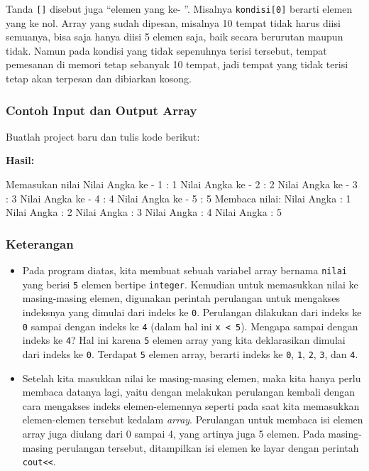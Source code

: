 Tanda \texttt{{[}{]}} disebut juga ``elemen yang ke- ''. Misalnya
\texttt{kondisi{[}0{]}} berarti elemen yang ke nol. Array yang sudah
dipesan, misalnya 10 tempat tidak harus diisi semuanya, bisa saja hanya
diisi 5 elemen saja, baik secara berurutan maupun tidak. Namun pada
kondisi yang tidak sepenuhnya terisi tersebut, tempat pemesanan di
memori tetap sebanyak 10 tempat, jadi tempat yang tidak terisi tetap
akan terpesan dan dibiarkan kosong.

\subsubsection*{Contoh  Input dan Output Array}

Buatlah project baru dan tulis kode berikut:



\textbf{Hasil:}
\begin{lcverbatim}
Memasukan nilai
Nilai Angka ke - 1 : 1
Nilai Angka ke - 2 : 2
Nilai Angka ke - 3 : 3
Nilai Angka ke - 4 : 4
Nilai Angka ke - 5 : 5
Membaca nilai:
Nilai Angka : 1
Nilai Angka : 2
Nilai Angka : 3
Nilai Angka : 4
Nilai Angka : 5
\end{lcverbatim}

\subsubsection*{Keterangan}

\begin{itemize}
\item
  Pada program diatas, kita membuat sebuah variabel array bernama
  \texttt{nilai} yang berisi \texttt{5} elemen bertipe \texttt{integer}.
  Kemudian untuk memasukkan nilai ke masing-masing elemen, digunakan
  perintah perulangan untuk mengakses indeksnya yang dimulai dari indeks
  ke \texttt{0}. Perulangan dilakukan dari indeks ke \texttt{0} sampai
  dengan indeks ke \texttt{4} (dalam hal ini
  \texttt{x\ \textless{}\ 5}). Mengapa sampai dengan indeks ke
  \texttt{4}? Hal ini karena \texttt{5} elemen array yang kita
  deklarasikan dimulai dari indeks ke \texttt{0}. Terdapat \texttt{5}
  elemen array, berarti indeks ke \texttt{0}, \texttt{1}, \texttt{2},
  \texttt{3}, dan \texttt{4}.
\item
  Setelah kita masukkan nilai ke masing-masing elemen, maka kita hanya
  perlu membaca datanya lagi, yaitu dengan melakukan perulangan kembali
  dengan cara mengakses indeks elemen-elemennya seperti pada saat kita
  memasukkan elemen-elemen tersebut kedalam \emph{array}. Perulangan
  untuk membaca isi elemen array juga diulang dari 0 sampai 4, yang
  artinya juga 5 elemen. Pada masing-masing perulangan tersebut,
  ditampilkan isi elemen ke layar dengan perintah
  \texttt{cout\textless{}\textless{}}.
\end{itemize}

